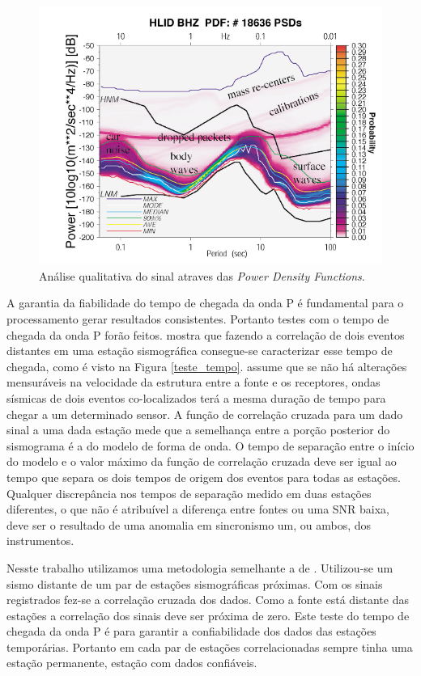 \begin{figure}[!ht]
\centering
\includegraphics[scale=0.8]{mcnamura_buland.png}
\caption{Análise qualitativa do sinal atraves das \textit{Power Density Functions}. \cite{McNamara_Buland_2004} }
\label{PQLX}
\end{figure}

A garantia da fiabilidade do tempo de chegada da onda P é fundamental para o processamento gerar resultados consistentes. Portanto testes com o tempo de chegada da onda P forão feitos. \cite{gibbons_identification_2006} mostra que fazendo a correlação de dois eventos distantes em uma estação sismográfica consegue-se caracterizar esse tempo de chegada, como é visto na Figura \ref{teste_tempo}. \cite{gibbons_identification_2006} assume que  se não há alterações mensuráveis na velocidade da estrutura entre a fonte e os receptores, ondas sísmicas de dois eventos co-localizados terá a mesma duração de tempo para chegar a um determinado sensor. A função de correlação cruzada para um dado sinal a uma dada estação mede que a semelhança entre a porção posterior do sismograma é a do modelo de forma de onda. O tempo de separação entre o início do modelo e o valor máximo da função de correlação cruzada deve ser igual ao tempo que separa os dois tempos de origem dos eventos para todas as estações. Qualquer discrepância nos tempos de separação medido em duas estações diferentes, o que não é atribuível a diferença entre fontes ou uma SNR baixa, deve ser o resultado de uma anomalia em sincronismo um, ou ambos, dos instrumentos.

Nesste trabalho utilizamos uma metodologia semelhante a de \cite{gibbons_identification_2006}. Utilizou-se um sismo distante de um par de estações sismográficas próximas. Com os sinais registrados fez-se a correlação cruzada dos dados. Como a fonte está distante das estações a correlação dos sinais deve ser próxima de zero. Este teste do tempo de chegada da onda P é para garantir a confiabilidade dos dados das estações temporárias. Portanto em cada par de estações correlacionadas sempre tinha uma estação permanente, estação com dados confiáveis.

